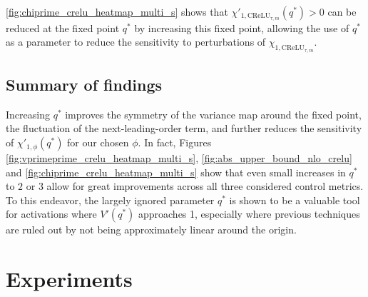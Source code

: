 \documentclass{article}
\theoremstyle{plain}
\theoremstyle{definition}
\theoremstyle{remark}
\begin{document}
\cref{fig:chiprime_crelu_heatmap_multi_s} shows that $\chi'_{1, \text{CReLU}_{\tau, m}}(q^*)>0$ can be reduced at the fixed point $q^*$ by increasing this fixed point, allowing the use of $q^*$ as a parameter to reduce the sensitivity to perturbations of $\chi_{1, \text{CReLU}_{\tau, m}}$.

\subsection{Summary of findings}
Increasing $q^*$ improves the symmetry of the variance map around the fixed point, the fluctuation of the next-leading-order term, and further reduces the sensitivity of $\chi'_{1, \phi}(q^*)$ for our chosen $\phi$. In fact, Figures \ref{fig:vprimeprime_crelu_heatmap_multi_s}, \ref{fig:abs_upper_bound_nlo_crelu} and \ref{fig:chiprime_crelu_heatmap_multi_s} show that even small increases in $q^*$ to $2$ or $3$ allow for great improvements across all three considered control metrics. To this endeavor, the largely ignored parameter $q^*$ is shown to be a valuable tool for activations where $V'(q^*)$ approaches 1, especially where previous techniques are ruled out by not being approximately linear around the origin. 

\section{Experiments}\label{sec:experiments}
\end{document}
